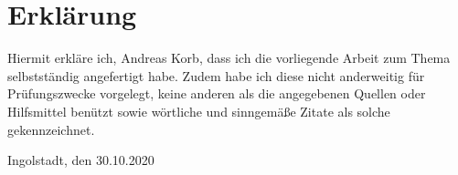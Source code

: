 \section*{Erklärung}
\thispagestyle{empty}
\makeatletter
Hiermit erkläre ich, Andreas Korb, dass ich die vorliegende Arbeit zum Thema
\textit{\@title} selbstständig angefertigt habe. Zudem habe ich diese nicht anderweitig für Prüfungszwecke vorgelegt, keine anderen als die angegebenen Quellen oder Hilfsmittel benützt sowie wörtliche und sinngemäße Zitate als solche gekennzeichnet.
\vspace{3cm}

Ingolstadt, den 30.10.2020
\makeatother
